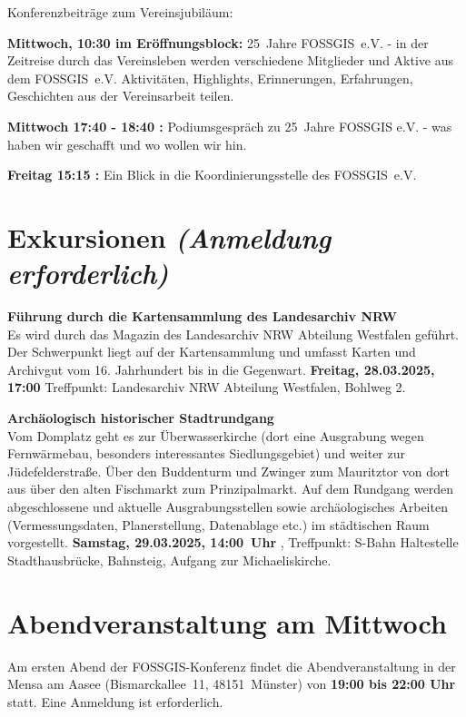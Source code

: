 \pagebreak
\noindent
Konferenzbeiträge zum Vereinsjubiläum:
\begin{description}
\item{\bfseries Mittwoch, 10:30 im Eröffnungsblock:} 25~Jahre FOSSGIS~e.V. - in der Zeitreise durch das Vereinsleben werden verschiedene Mitglieder und Aktive aus dem FOSSGIS~e.V. Aktivitäten, Highlights, Erinnerungen, Erfahrungen, Geschichten aus der Vereinsarbeit teilen.
\item{\bfseries Mittwoch 17:40 - 18:40 \HSeins:} Podiumsgespräch zu 25~Jahre FOSSGIS e.V. - was haben wir geschafft und wo wollen wir hin.
\item{\bfseries Freitag 15:15 \HSeins:} Ein Blick in die Koordinierungsstelle des FOSSGIS~e.V.
\end{description}

\section*{Exkursionen {\normalfont\em (Anmeldung erforderlich)}}\label{exkursionen}
\noindent
{\large \bfseries Führung durch die Kartensammlung des Landesarchiv NRW}\\
Es wird durch das Magazin des Landesarchiv NRW Abteilung Westfalen geführt. Der Schwerpunkt liegt auf der Kartensammlung und umfasst Karten und Archivgut vom 16. Jahrhundert bis in die Gegenwart. {\bfseries Freitag, 28.03.2025, 17:00} Treffpunkt: Landesarchiv NRW Abteilung Westfalen, Bohlweg 2.
\bigskip

\noindent
{\large \bfseries Archäologisch historischer Stadtrundgang}\\
Vom Domplatz geht es zur Überwasserkirche (dort eine Ausgrabung wegen Fernwärmebau, besonders interessantes Siedlungsgebiet) und weiter zur Jüdefelderstraße. Über den Buddenturm und Zwinger zum Mauritztor von dort aus über den alten Fischmarkt zum Prinzipalmarkt. Auf dem Rundgang werden abgeschlossene und aktuelle Ausgrabungsstellen sowie archäologisches Arbeiten (Vermessungsdaten, Planerstellung, Datenablage etc.) im städtischen Raum vorgestellt. {\bfseries Samstag, 29.03.2025, 14:00~Uhr }, Treffpunkt: S-Bahn Haltestelle Stadthausbrücke, Bahnsteig, Aufgang zur Michaeliskirche.
\bigskip

\section*{Abendveranstaltung am Mittwoch}\label{schwaetzli}
Am ersten Abend der FOSSGIS-Konferenz findet die Abendveranstaltung in der Mensa am Aasee (Bismarckallee~11, 48151~Münster) von {\bfseries 19:00 bis 22:00 Uhr} statt. Eine Anmeldung ist erforderlich.

